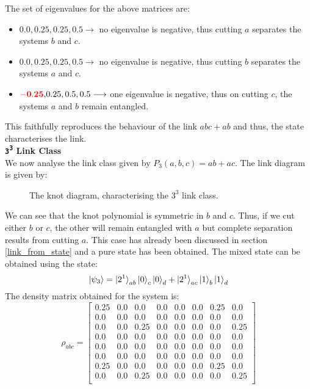\documentclass{scrartcl}
\begin{document}
    The set of eigenvalues for the above matrices are:
    \begin{itemize}
        \item $0.0, 0.25, 0.25, 0.5 \longrightarrow$ no eigenvalue is negative, thus cutting $a$ separates the systems $b$ and $c$.        
        \item $0.0, 0.25, 0.25, 0.5 \longrightarrow$ no eigenvalue is negative, thus cutting $b$ separates the systems $a$ and $c$.        
       \item $ \mathbf{\mathcolor{red}{-0.25},} 0.25, 0.5, 0.5 \longrightarrow$ one eigenvalue is negative, thus on cutting $c$, the systems $a$ and $b$ remain entangled.
    \end{itemize}
    This faithfully reproduces the behaviour of the link $abc+ab$ and thus, the state characterises the link.\\[0.3cm]
\textbf{\large \texttt{3\textsuperscript{3}} Link Class} \\[0.3cm]
We now analyse the link class given by $P_3(a,b,c) = ab+ac$. The link diagram is given by:
\begin{figure}[H]
    \centering
    
  \caption{The knot diagram, characterising the $3^3$ link class.}
\end{figure}
\noindent
We can see that the knot polynomial is symmetric in $b$ and $c$. Thus, if we cut either $b$ or $c$, the other will remain entangled with $a$ but complete separation results from cutting $a$. This case has already been discussed in section \ref{link_from_state} and a pure state has been obtained. The mixed state can be obtained using the state:
$$\ket{\psi_3} = \ket{2^1}_{ab}\ket{0}_c\ket{0}_d + \ket{2^1}_{ac}\ket{1}_b\ket{1}_d  $$ 
The density matrix obtained for the system is: 
\begin{equation*}
    \rho_{abc}=
    \left[
    \begin{array}{cccccccc}
    0.25 & 0.0 & 0.0 & 0.0 & 0.0 & 0.0 & 0.25 & 0.0 \\
    0.0 & 0.0 & 0.0 & 0.0 & 0.0 & 0.0 & 0.0 & 0.0 \\
    0.0 & 0.0 & 0.25 & 0.0 & 0.0 & 0.0 & 0.0 & 0.25 \\
    0.0 & 0.0 & 0.0 & 0.0 & 0.0 & 0.0 & 0.0 & 0.0 \\
    0.0 & 0.0 & 0.0 & 0.0 & 0.0 & 0.0 & 0.0 & 0.0 \\
    0.0 & 0.0 & 0.0 & 0.0 & 0.0 & 0.0 & 0.0 & 0.0 \\
    0.25 & 0.0 & 0.0 & 0.0 & 0.0 & 0.0 & 0.25 & 0.0 \\
    0.0 & 0.0 & 0.25 & 0.0 & 0.0 & 0.0 & 0.0 & 0.25 \\
    \end{array}
    \right]
    \end{equation*}
\end{document}
